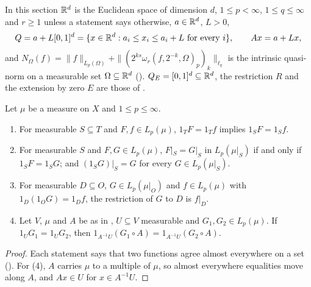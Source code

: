 In this section $\mathbb{R}^d$ is the Euclidean space of dimension $d$, $1 \leq p < \infty$,
$1 \leq q \leq \infty$ and $r \geq 1$ unless a statement says otherwise, $a \in \mathbb{R}^d$, $L > 0$,
\[
  Q = a + L [0, 1]^d = \{x \in \mathbb{R}^d : a_i \leq x_i \leq a_i + L \text{ for every } i\} ,
  \qquad A x = a + L x ,
\]
and $N_\Omega(f) = \|f\|_{L_p(\Omega)} + \|(2^{ks} \omega_r(f, 2^{-k}, \Omega)_p)_k\|_{\ell_q}$ is
the intrinsic quasi-norm on a measurable set $\Omega \subseteq \mathbb{R}^d$ ().
$Q_E = [0, 1]^d \subseteq \mathbb{R}^d$, the restriction $R$ and the extension by zero $E$ are those of
.

\begin{lemma}
\label{lem:agreement-subsets}
\leanok
{}
Let $\mu$ be a measure on $X$ and $1 \leq p \leq \infty$.
\begin{enumerate}
  \item For measurable $S \subseteq T$ and $F, f \in L_p(\mu)$, $1_T F = 1_T f$ implies
    $1_S F = 1_S f$.
  \item For measurable $S$ and $F, G \in L_p(\mu)$, $F|_S = G|_S$ in $L_p(\mu|_S)$ if and only if
    $1_S F = 1_S G$; and $(1_S G)|_S = G$ for every $G \in L_p(\mu|_S)$.
  \item For measurable $D \subseteq O$, $G \in L_p(\mu|_O)$ and $f \in L_p(\mu)$ with
    $1_D (1_O G) = 1_D f$, the restriction of $G$ to $D$ is $f|_D$.
  \item Let $V$, $\mu$ and $A$ be as in , $U \subseteq V$ measurable
    and $G_1, G_2 \in L_p(\mu)$. If $1_U G_1 = 1_U G_2$, then
    $1_{A^{-1} U} (G_1 \circ A) = 1_{A^{-1} U} (G_2 \circ A)$.
\end{enumerate}
\end{lemma}

\begin{proof}
\leanok
{}
Each statement says that two functions agree almost everywhere on a set
(). For (4), $A$ carries $\mu$ to a multiple of $\mu$, so almost
everywhere equalities move along $A$, and $A x \in U$ for $x \in A^{-1} U$.
\end{proof}

